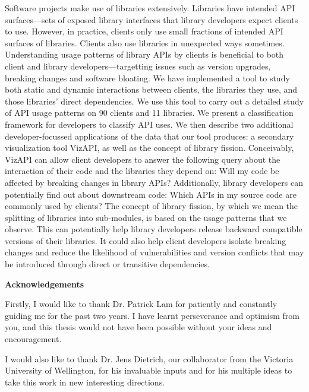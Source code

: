 Software projects make use of libraries extensively. Libraries have intended API surfaces—sets of exposed library interfaces that library developers expect clients to use. However, in practice, clients only use small fractions of intended API surfaces of libraries. Clients also use libraries in unexpected ways sometimes. Understanding usage patterns of library APIs by clients is beneficial to both client and library developers—targetting issues such as version upgrades, breaking changes and software bloating. We have implemented a tool to study both static and dynamic interactions between clients, the libraries they use, and those libraries’ direct dependencies. We use this tool to carry out a detailed study of API usage patterns on 90 clients and 11 libraries. We present a classification framework for developers to classify API uses. We then describe two additional developer-focussed applications of the data that our tool produces: a secondary visualization tool VizAPI, as well as the concept of library fission. Conceivably, VizAPI can allow client developers to answer the following query about the interaction of their code and the libraries they depend on: Will my code be affected by breaking changes in library APIs? Additionally, library developers can potentially find out about downstream code: Which APIs in my source code are commonly used by clients? The concept of library fission, by which we mean the splitting of libraries into sub-modules, is based on the usage patterns that we observe. This can potentially help library developers release backward compatible versions of their libraries. It could also help client developers isolate breaking changes and reduce the likelihood of vulnerabilities and version conflicts that may be introduced through direct or transitive dependencies. 

\cleardoublepage


\begin{center}\textbf{Acknowledgements}\end{center}
Firstly, I would like to thank Dr. Patrick Lam for patiently and constantly guiding me for the past two years. I have learnt perseverance and optimism from you, and this thesis would not have been possible without your ideas and encouragement.

I would also like to thank Dr. Jens Dietrich, our collaborator from the Victoria University of Wellington, for his invaluable inputs and for his multiple ideas to take this work in new interesting directions.

